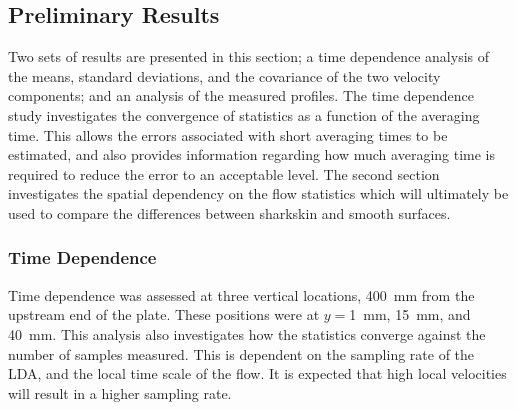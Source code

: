 \documentclass[12pt,oneside,a4paper]{article}
\begin{document}




\subsection{Preliminary Results}
Two sets of results are presented in this section; a time dependence analysis of the means, standard deviations, and the covariance of the two velocity components; and an analysis of the measured profiles. The time dependence study investigates the convergence of statistics as a function of the averaging time. This allows the errors associated with short averaging times to be estimated, and also provides information regarding how much averaging time is required to reduce the error to an acceptable level. The second section investigates the spatial dependency on the flow statistics which will ultimately be used to compare the differences between sharkskin and smooth surfaces.

\subsubsection{Time Dependence}
\label{section:experiments:timeDep}

Time dependence was assessed at three vertical locations, \SI{400}{mm} from the upstream end of the plate. These positions were at $y=$\SI{1}{mm}, \SI{15}{mm}, and \SI{40}{mm}. This analysis also investigates how the statistics converge against the number of samples measured. This is dependent on the sampling rate of the LDA, and the local time scale of the flow. It is expected that high local velocities will result in a higher sampling rate.
\end{document}
